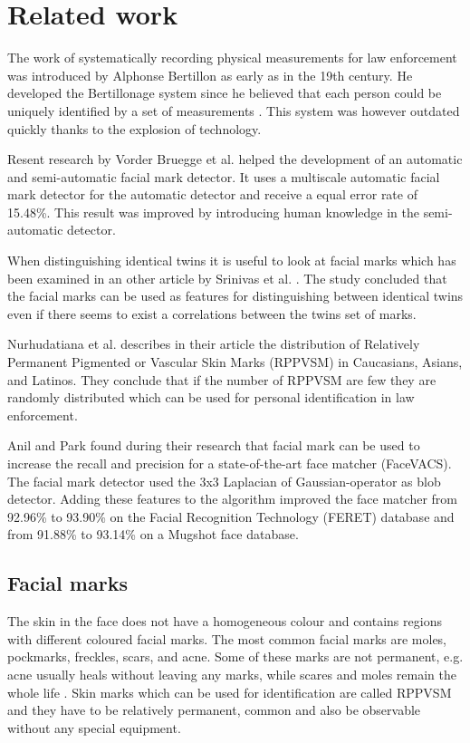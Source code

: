 \chapter{Related work}\label{cha:related_work}
The work of systematically recording physical measurements for law enforcement was introduced by Alphonse Bertillon as early as in the 19th century. He developed the Bertillonage system since he believed that each person could be uniquely identified by a set of measurements \cite{Bertillon}. This system was however outdated quickly thanks to the explosion of technology.

Resent research by Vorder Bruegge et al. \cite{automatic_detector_2015} helped the development of an automatic and semi-automatic facial mark detector. It uses a multiscale automatic facial mark detector for the automatic detector and receive a equal error rate of 15.48\%. This result was improved by introducing human knowledge in the semi-automatic detector.

When distinguishing identical twins it is useful to look at facial marks which has been examined in an other article by Srinivas et al. \cite{twins}. The study concluded that the facial marks can be used as features for distinguishing between identical twins even if there seems to exist a correlations between the twins set of marks.

Nurhudatiana et al. \cite{statistic_RPPVSM} describes in their article the distribution of Relatively Permanent Pigmented or Vascular Skin Marks (RPPVSM) in Caucasians, Asians, and Latinos. They conclude that if the number of RPPVSM are few they are randomly distributed which can be used for personal identification in law enforcement. 

Anil and Park found during their research \cite{jain_facial} that facial mark can be used to increase the recall and precision for a state-of-the-art face matcher (FaceVACS). The facial mark detector used the 3x3 Laplacian of Gaussian-operator as blob detector. Adding these features to the algorithm improved the face matcher from  92.96\% to 93.90\% on the Facial Recognition Technology (FERET) database and from 91.88\% to 93.14\% on a Mugshot face database. 




\section{Facial marks}
The skin in the face does not have a homogeneous colour and contains regions with different coloured facial marks. The most common facial marks are moles, pockmarks, freckles, scars, and acne. Some of these marks are not permanent, e.g. acne usually heals without leaving any marks, while scares and moles remain the whole life    \cite{automatic_detector_2015}. Skin marks which can be used for identification are called RPPVSM and they have to be relatively permanent, common and also be observable without any special equipment. \cite{statistic_RPPVSM}